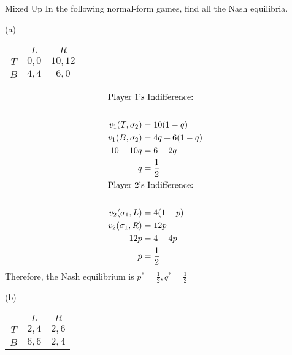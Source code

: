 \documentclass[8pt]{extarticle}
\begin{document}
  \begin{problem}{Mixed Up}
    In the following normal-form games, find all the Nash equilibria.
    \tcblower
    \begin{problem}{(a)}
      \begin{center}
        \renewcommand{\arraystretch}{1.5}
        \begin{tabular}{c|c|c|}
          \multicolumn{1}{c}{} & \multicolumn{1}{c}{$L$} & \multicolumn{1}{c}{$R$}\\
          \cline{2-3}
          $T$ & $0,0$ & $10,12$\\
          \cline{2-3}
          $B$ & $4,4$ & $6,0$\\
          \cline{2-3}
        \end{tabular}
      \end{center}
      \tcblower
      \begin{align*}
        \shortintertext{Player 1's Indifference:}\\
        v_1(T,\sigma_2) &= 10(1-q)\\
        v_1(B,\sigma_2) &= 4q + 6(1-q)\\
        10-10q &= 6-2q\\
        q &= \frac{1}{2}\\
        \shortintertext{Player 2's Indifference:}\\
        v_2(\sigma_1,L) &= 4(1-p)\\
        v_2(\sigma_1,R) &= 12p\\
        12p &= 4-4p\\
        p &= \frac{1}{2}
      \end{align*}
      Therefore, the Nash equilibrium is $p^* = \frac{1}{2},q^* = \frac{1}{2}$
    \end{problem}
    \begin{problem}{(b)}
      \begin{center}
        \renewcommand{\arraystretch}{1.5}
        \begin{tabular}{c|c|c|}
          \multicolumn{1}{c}{} & \multicolumn{1}{c}{$L$} & \multicolumn{1}{c}{$R$}\\
          \cline{2-3}
          $T$ & $2,4$ & $2,6$\\
          \cline{2-3}
          $B$ & $6,6$ & $2,4$\\
          \cline{2-3}
        \end{tabular}
      \end{center}
      \tcblower
      \begin{align*}

\end{align*}
\end{problem}
\end{problem}
\end{document}
